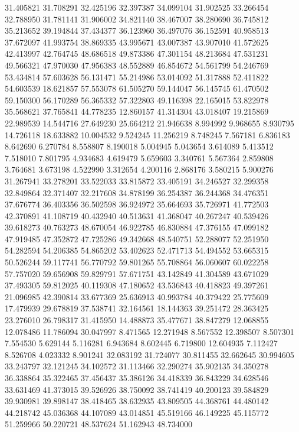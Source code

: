31.405821
31.708291
32.425196
32.397387
34.099104
31.902525
33.266454
32.788950
31.781141
31.906002
34.821140
38.467007
38.280690
36.745812
35.213652
39.194844
37.434377
36.123960
36.497076
36.152591
40.958513
37.672097
41.993754
38.869335
43.995671
43.007387
43.907010
41.572625
42.413997
42.764745
48.686518
49.873386
47.301154
48.213684
47.531231
49.566321
47.970030
47.956383
48.552889
46.854672
54.561799
54.246769
53.434814
57.603628
56.131471
55.214986
53.014092
51.317888
52.411822
54.603539
18.621857
57.553078
61.505270
59.144047
56.145745
61.470502
59.150300
56.170289
56.365332
57.322803
49.116398
22.165015
53.822978
35.568621
37.765841
44.778235
12.860157
41.314304
43.018407
19.215869
22.989539
14.544716
27.649230
25.664212
21.946638
8.994992
9.968655
8.930795
14.726118
18.633882
10.004532
9.524245
11.256219
8.748245
7.567181
6.836183
8.642690
6.270784
8.558807
8.190018
5.004945
5.043654
3.614089
5.413512
7.518010
7.801795
4.934683
4.619479
5.659603
3.340761
5.567364
2.859808
3.764681
3.673198
4.522990
3.312654
4.200116
2.868176
3.580215
5.900276
31.267941
33.278201
33.522033
33.815872
33.405191
34.246527
32.299358
32.849864
32.371407
32.217608
34.878199
36.254387
36.244368
34.476351
37.676774
36.403356
36.502598
36.924972
35.664693
35.726971
41.772503
42.370891
41.108719
40.432940
40.513631
41.368047
40.267247
40.539426
39.618273
40.763273
48.670054
46.922785
46.830884
47.376155
47.099182
47.919485
47.352872
47.725286
49.342668
48.540751
52.288077
52.251950
54.282594
54.206385
54.865202
53.402623
52.471713
54.494552
53.665315
50.526244
59.117741
56.770792
59.801265
55.708864
56.060607
60.022258
57.757020
59.656908
59.829791
57.671751
43.142849
41.304589
43.671029
37.493305
59.812025
40.119308
47.180652
43.536843
40.418823
49.397261
21.096985
42.390814
33.677369
25.636913
40.993784
40.379422
25.775609
17.479939
29.678819
37.538741
32.164561
18.144363
39.251472
28.363425
23.276010
26.798317
31.415950
14.488873
35.477671
38.847279
12.068855
12.078486
11.786094
30.047997
8.471565
12.271948
8.567552
12.398507
8.507301
7.554530
5.629144
5.116281
6.943684
8.602445
6.719800
12.604935
7.112427
8.526708
4.023332
8.901241
32.083192
31.724077
30.811455
32.662645
30.994605
33.243797
32.121245
34.102572
31.113466
32.290274
35.902135
34.350278
36.338864
35.322465
37.456437
35.386126
34.418339
36.843229
34.628546
33.631469
41.373015
39.526926
38.750092
38.741419
40.200123
39.584829
39.930981
39.898147
38.418465
38.632935
43.809505
44.368761
44.480142
44.218742
45.036368
44.107089
43.014851
45.519166
46.149225
45.115772
51.259966
50.220721
48.537624
51.162943
48.734000
